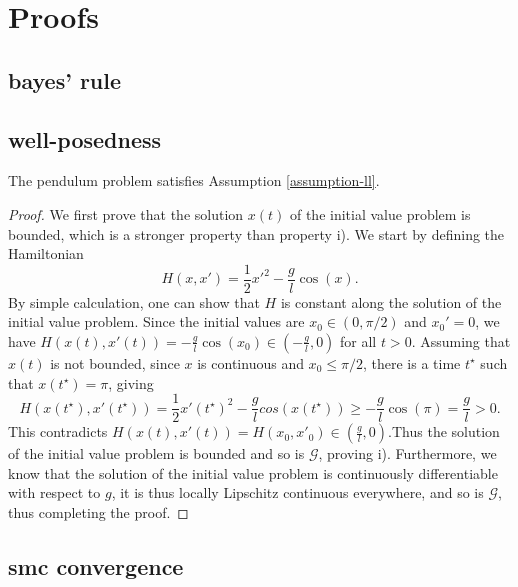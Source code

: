 \section{Proofs}

\subsection{bayes' rule}



\subsection{well-posedness}



\begin{lemma} The pendulum problem satisfies Assumption \ref{assumption-ll}.
\end{lemma}

\begin{proof}
  We first prove that the solution $x(t)$ of the initial value problem is bounded, which is a stronger property than property i). We start by defining the Hamiltonian
  \begin{equation*}
    H(x, x') = \frac12 x'^2 - \frac{g}{l}\cos(x).
  \end{equation*}
  By simple calculation, one can show that $H$ is constant along the solution of the initial value problem. Since the initial values are $x_0 \in (0, \pi/2)$ and $x_0' = 0$, we have $H(x(t), x'(t)) = -\frac{g}{l}\cos(x_0) \in (-\frac{g}{l}, 0)$ for all $t > 0$. Assuming that $x(t)$ is not bounded, since $x$ is continuous and $x_0 \le \pi/2$, there is a time $t^\star$ such that $x(t^\star) = \pi$, giving
  \begin{equation*}
    H(x(t^\star), x'(t^\star)) = \frac12 x'(t^\star)^2 - \frac{g}{l}cos(x(t^\star)) \ge -\frac{g}{l}\cos(\pi) = \frac{g}{l} > 0.
  \end{equation*}
  This contradicts $H(x(t), x'(t)) = H(x_0, x'_0) \in (\frac{g}{l}, 0)$.Thus the solution of the initial value problem is bounded and so is $\mathcal{G}$, proving i).
  Furthermore, we know that the solution of the initial value problem is continuously differentiable with respect to $g$, it is thus locally Lipschitz continuous everywhere, and so is $\mathcal{G}$, thus completing the proof.
\end{proof}

\subsection{smc convergence}

